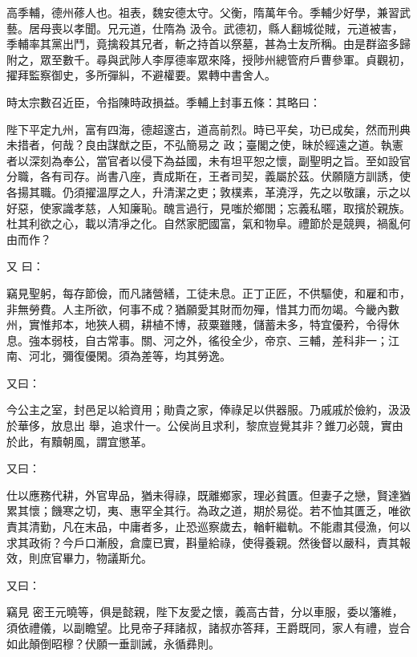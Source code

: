 \begin{pinyinscope}
 高季輔，德州蓚人也。祖表，魏安德太守。父衡，隋萬年令。季輔少好學，兼習武藝。居母喪以孝聞。兄元道，仕隋為
 汲令。武德初，縣人翻城從賊，元道被害，季輔率其黨出鬥，竟擒殺其兄者，斬之持首以祭墓，甚為士友所稱。由是群盜多歸附之，眾至數千。尋與武陟人李厚德率眾來降，授陟州總管府戶曹參軍。貞觀初，擢拜監察御史，多所彈糾，不避權要。累轉中書舍人。



 時太宗數召近臣，令指陳時政損益。季輔上封事五條：其略曰：



 陛下平定九州，富有四海，德超邃古，道高前烈。時已平矣，功已成矣，然而刑典未措者，何哉？良由謀猷之臣，不弘簡易之
 政；臺閣之使，昧於經遠之道。執憲者以深刻為奉公，當官者以侵下為益國，未有坦平恕之懷，副聖明之旨。至如設官分職，各有司存。尚書八座，責成斯在，王者司契，義屬於茲。伏願隨方訓誘，使各揚其職。仍須擢溫厚之人，升清潔之吏；敦樸素，革澆浮，先之以敬讓，示之以好惡，使家識孝慈，人知廉恥。醜言過行，見嗤於鄉閭；忘義私暱，取擯於親族。杜其利欲之心，載以清凈之化。自然家肥國富，氣和物阜。禮節於是競興，禍亂何由而作？



 又
 曰：



 竊見聖躬，每存節儉，而凡諸營繕，工徒未息。正丁正匠，不供驅使，和雇和市，非無勞費。人主所欲，何事不成？猶願愛其財而勿殫，惜其力而勿竭。今畿內數州，實惟邦本，地狹人稠，耕植不博，菽粟雖賤，儲蓄未多，特宜優矜，令得休息。強本弱枝，自古常事。關、河之外，徭役全少，帝京、三輔，差科非一；江南、河北，彌復優閑。須為差等，均其勞逸。



 又曰：



 今公主之室，封邑足以給資用；勛貴之家，俸祿足以供器服。乃戚戚於儉約，汲汲於華侈，放息出
 舉，追求什一。公侯尚且求利，黎庶豈覺其非？錐刀必競，實由於此，有黷朝風，謂宜懲革。



 又曰：



 仕以應務代耕，外官卑品，猶未得祿，既離鄉家，理必貧匱。但妻子之戀，賢達猶累其懷；饑寒之切，夷、惠罕全其行。為政之道，期於易從。若不恤其匱乏，唯欲責其清勤，凡在末品，中庸者多，止恐巡察歲去，輶軒繼軌。不能肅其侵漁，何以求其政術？今戶口漸殷，倉廩已實，斟量給祿，使得養親。然後督以嚴科，責其報效，則庶官畢力，物議斯允。



 又曰：



 竊見
 密王元曉等，俱是懿親，陛下友愛之懷，義高古昔，分以車服，委以籓維，須依禮儀，以副瞻望。比見帝子拜諸叔，諸叔亦答拜，王爵既同，家人有禮，豈合如此顛倒昭穆？伏願一垂訓誡，永循彞則。




\end{pinyinscope}
